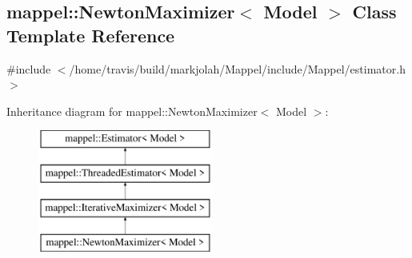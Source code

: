 \hypertarget{classmappel_1_1NewtonMaximizer}{}\subsection{mappel\+:\+:Newton\+Maximizer$<$ Model $>$ Class Template Reference}
\label{classmappel_1_1NewtonMaximizer}


{\ttfamily \#include $<$/home/travis/build/markjolah/\+Mappel/include/\+Mappel/estimator.\+h$>$}

Inheritance diagram for mappel\+:\+:Newton\+Maximizer$<$ Model $>$\+:\begin{figure}[H]
\begin{center}
\leavevmode
\includegraphics[height=4.000000cm]{classmappel_1_1NewtonMaximizer}
\end{center}
\end{figure}
